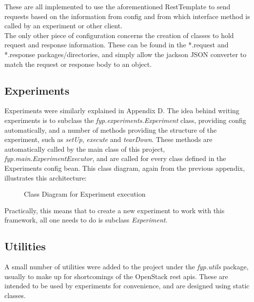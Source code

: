 These are all implemented to use the aforementioned RestTemplate to send requests based on the information from config and from which interface method is called by an experiment or other client.  \\
The only other piece of configuration concerns the creation of classes to hold request and response information. These can be found in the *.request and *.response packages/directories, and simply allow the jackson JSON converter to match the request or response body to an object. 

\subsection{Experiments}

Experiments were similarly explained in Appendix D. The idea behind writing experiments is to subclass the \textit{fyp.experiments.Experiment} class, providing config automatically, and a number of methods providing the structure of the experiment, such as \textit{setUp}, \textit{execute} and \textit{tearDown}. These methods are automatically called by the main class of this project, \textit{fyp.main.ExperimentExecutor}, and are called for every class defined in the Experiments config bean. 
This class diagram, again from the previous appendix, illustrates this architecture: 
\begin{figure}[ht]
\centering
{}
\caption{Class Diagram for Experiment execution} 
\end{figure}

Practically, this means that to create a new experiment to work with this framework, all one needs to do is subclass \textit{Experiment}. 


\subsection{Utilities}

A small number of utilities were added to the project under the \textit{fyp.utils} package, usually to make up for shortcomings of the OpenStack rest apis. These are intended to be used by experiments for convenience, and are designed using static classes. \\

